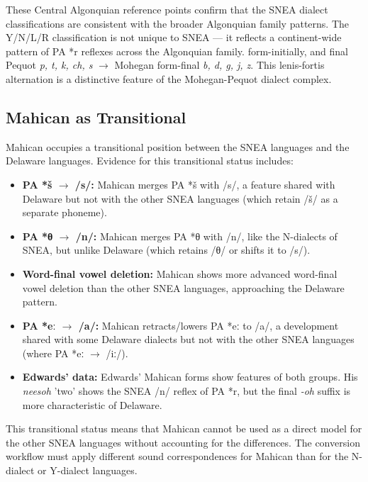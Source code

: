 These Central Algonquian reference points confirm that the SNEA dialect
classifications are consistent with the broader Algonquian family patterns.
The Y/N/L/R classification is not unique to SNEA --- it reflects a
continent-wide pattern of PA *r reflexes across the Algonquian family.
form-initially, and final Pequot \textit{p, t, k, ch, s} $\rightarrow$
Mohegan form-final \textit{b, d, g, j, z}. This lenis-fortis alternation is
a distinctive feature of the Mohegan-Pequot dialect complex.

\subsection{Mahican as Transitional}

Mahican occupies a transitional position between the SNEA languages and the
Delaware languages. Evidence for this transitional status includes:

\begin{itemize}
  \item \textbf{PA *š $\rightarrow$ /s/:} Mahican merges PA *š with /s/, a
    feature shared with Delaware but not with the other SNEA languages
    (which retain /š/ as a separate phoneme).

  \item \textbf{PA *θ $\rightarrow$ /n/:} Mahican merges PA *θ with /n/,
    like the N-dialects of SNEA, but unlike Delaware (which retains /θ/ or
    shifts it to /s/).

  \item \textbf{Word-final vowel deletion:} Mahican shows more advanced
    word-final vowel deletion than the other SNEA languages, approaching the
    Delaware pattern.

  \item \textbf{PA *eː $\rightarrow$ /a/:} Mahican retracts/lowers PA *eː to
    /a/, a development shared with some Delaware dialects but not with the
    other SNEA languages (where PA *eː $\rightarrow$ /iː/).

  \item \textbf{Edwards' data:} Edwards' Mahican forms show features of
    both groups. His \textit{neesoh} 'two' shows the SNEA /n/ reflex of PA
    *r, but the final \textit{-oh} suffix is more characteristic of Delaware.
\end{itemize}

This transitional status means that Mahican cannot be used as a direct model
for the other SNEA languages without accounting for the differences. The
conversion workflow must apply different sound correspondences for Mahican
than for the N-dialect or Y-dialect languages.

